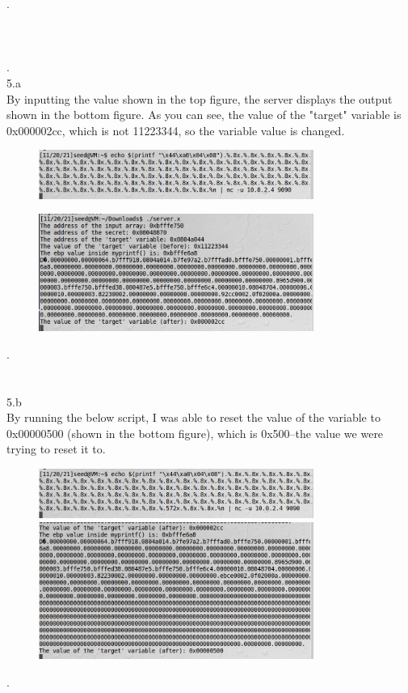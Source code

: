 \documentclass[12pt, a4paper]{article}
\begin{document}
.\\ \\ \\ \\
.\\
\noindent
5.a\\
By inputting the value shown in the top figure, the server displays the output shown in the bottom figure.  As you can see, the value of the "target" variable is 0x000002cc, which is not 11223344, so the variable value is changed. 
\begin{figure}[ht!]
\centering
\includegraphics[width=90mm]{"Capture11.png"} 

\includegraphics[width=90mm]{"Capture12.png"} \\
\end{figure}
. \\ \\ \\


\noindent
5.b\\
By running the below script, I was able to reset the value of the variable to 0x00000500 (shown in the bottom figure), which is 0x500--the value we were trying to reset it to.
\begin{figure}[h!]
\centering
\includegraphics[width=90mm]{"Capture13.png"} \\

\includegraphics[width=90mm]{"Capture14.png"} \\
\end{figure}
.\\ \\ \\
\end{document}
